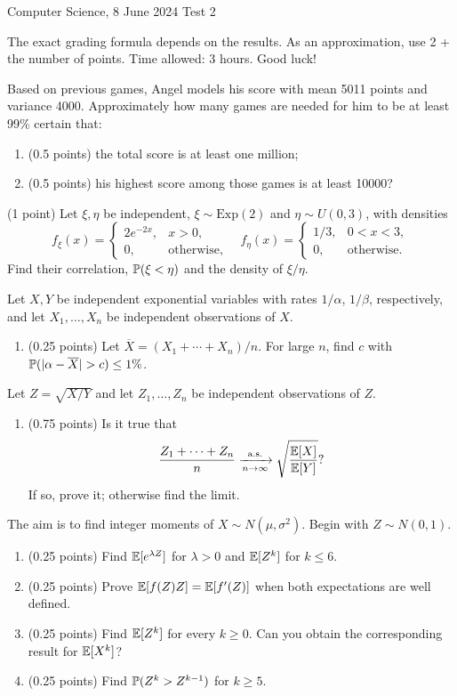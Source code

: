 \documentclass[a4paper]{report}
\begin{document}
\noindent Computer Science, 8 June 2024 \hfill Test 2
\hrulefill
\begin{it}The exact grading formula depends on the results. As an approximation, use 2 + the number of points. Time allowed: 3 hours. Good luck!\end{it}
\begin{problem}
Based on previous games, Angel models his score with mean 5011 points and variance 4000. Approximately how many games are needed for him to be at least 99\% certain that:
\begin{enumerate}
\item (0.5 points) the total score is at least one million;
\item (0.5 points) his highest score among those games is at least 10000?
\end{enumerate}
\end{problem}
\begin{problem} (1 point)
Let $\xi,\eta$ be independent, $\xi\sim\mathrm{Exp}(2)$ and $\eta\sim U(0,3)$, with densities
\[f_\xi(x)=\begin{cases}2e^{-2x},&x>0,\\0,&\text{otherwise,}\end{cases}\quad f_\eta(x)=\begin{cases}1/3,&0<x<3,\\0,&\text{otherwise.}\end{cases}\]
Find their correlation, $\P(\xi<\eta)$ and the density of $\xi/\eta$.
\end{problem}
\begin{problem}
Let $X,Y$ be independent exponential variables with rates $1/\alpha$, $1/\beta$, respectively, and let $X_1,\ldots,X_n$ be independent observations of $X$.
\begin{enumerate}
\item (0.25 points) Let $\overline X=(X_1+\cdots+X_n)/n$. For large $n$, find $c$ with $\P(|\alpha-\overline X|>c)\leq1\%$.
\end{enumerate}
Let $Z=\sqrt{X/Y}$ and let $Z_1,\ldots,Z_n$ be independent observations of $Z$.
\begin{enumerate}[start=2]
\item (0.75 points) Is it true that
\[\frac{Z_1+\cdots+Z_n}{n}\xrightarrow[n\to\infty]{\mathrm{a.s.}}\sqrt{\frac{\E[X]}{\E[Y]}}?\]
If so, prove it; otherwise find the limit.
\end{enumerate}
\end{problem}
\begin{problem}
The aim is to find integer moments of $X\sim N(\mu,\sigma^2)$. Begin with $Z\sim N(0,1)$.
\begin{enumerate}
\item (0.25 points) Find $\E[e^{\lambda Z}]$ for $\lambda>0$ and $\E[Z^k]$ for $k\leq6$.
\item (0.25 points) Prove $\E[f(Z)Z]=\E[f'(Z)]$ when both expectations are well defined.
\item (0.25 points) Find $\E[Z^k]$ for every $k\geq0$. Can you obtain the corresponding result for $\E[X^k]$?
\item (0.25 points) Find $\P(Z^k>Z^{k-1})$ for $k\geq5$.
\end{enumerate}
\end{problem}
\end{document}
